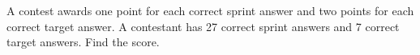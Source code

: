 A contest awards one point for each correct sprint answer and two points for each correct target answer. A contestant has 27 correct sprint answers and 7 correct target answers. Find the score.

